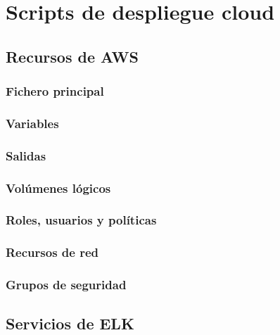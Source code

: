 \chapter{Scripts de despliegue cloud}\label{anexo:cloud}
\section{Recursos de AWS}
\subsection{Fichero principal}

\newpage{}
\subsection{Variables}

\newpage{}
\subsection{Salidas}

\newpage{}
\subsection{Volúmenes lógicos}

\newpage{}
\subsection{Roles, usuarios y políticas}

\newpage{}
\subsection{Recursos de red}

\newpage{}
\subsection{Grupos de seguridad}


\newpage{}
\section{Servicios de ELK}
